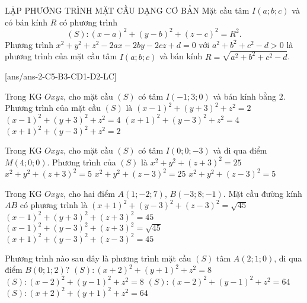 \begin{dang}{LẬP PHƯƠNG TRÌNH MẶT CẦU DẠNG CƠ BẢN}
	Mặt cầu tâm $I(a;b;c)$ và có bán kính $R$ có phương trình $$(S)\colon{(x-a)^2}+(y-b)^2+(z-c)^2=R^2.$$	
	Phương trình $x^2+y^2+z^2-2ax-2by-2cz+d=0$ với $a^2+b^2+c^2-d>0$ là phương trình của mặt cầu tâm $I(a;b;c)$ và bán kính $R=\sqrt{a^2+b^2+c^2-d}$.	
\end{dang}
\TN
{}[ans/ans-2-C5-B3-CD1-D2-LC]
\begin{ex}%
	Trong KG $Oxyz$, cho mặt cầu $(S)$ có tâm $I(-1;3;0)$ và bán kính bằng $2$. Phương trình của mặt cầu $(S)$ là
	\choice
	{$(x-1)^2+(y+3)^2+z^2=2$}
	{$(x-1)^2+(y+3)^2+z^2=4$}
	{\True $(x+1)^2+(y-3)^2+z^2=4$}
	{$(x+1)^2+(y-3)^2+z^2=2$}
\end{ex}

\begin{ex}%
	Trong KG $Oxyz$, cho mặt cầu $(S)$ có tâm $I(0;0;-3)$ và đi qua điểm $M(4;0;0)$. Phương trình của $(S)$ là
	\choice
	{\True $x^2+y^2+(z+3)^2=25$}
	{$x^2+y^2+(z+3)^2=5$}
	{$x^2+y^2+(z-3)^2=25$}
	{$x^2+y^2+(z-3)^2=5$}
\end{ex}

\begin{ex}%
	Trong KG $Oxyz$, cho hai điểm $A(1;-2;7)$, $B(-3;8;-1)$. Mặt cầu đường kính $AB$ có phương trình là
	\choice
	{$(x+1)^2+(y-3)^2+(z-3)^2=\sqrt{45}$}
	{$(x-1)^2+(y+3)^2+(z+3)^2=45$}
	{$(x-1)^2+(y-3)^2+(z+3)^2=\sqrt{45}$}
	{\True $(x+1)^2+(y-3)^2+(z-3)^2=45$}
\end{ex}

\begin{ex}%
	Phương trình nào sau đây là phương trình mặt cầu $(S)$ tâm $A(2;1;0)$, đi qua điểm $B(0;1;2)$?
	\choice
	{$(S)\colon{(x+2)^2}+(y+1)^2+z^2=8$}
	{\True $(S)\colon{(x-2)^2}+(y-1)^2+z^2=8$}
	{$(S)\colon{(x-2)^2}+(y-1)^2+z^2=64$}
	{$(S)\colon{(x+2)^2}+(y+1)^2+z^2=64$}
\end{ex}

